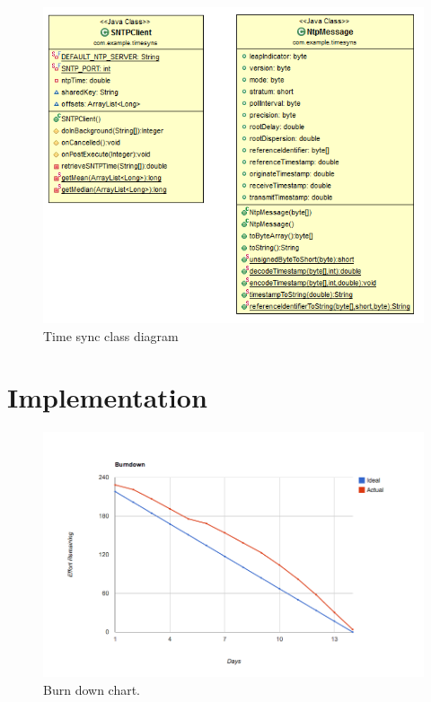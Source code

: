 \begin{figure}[H]
	\centering
		\includegraphics[width=14cm]{sprint5/sprint5_class_diagram.png}
	\caption{Time sync class diagram}
	\label{fig:Time_Sync_class }
\end{figure}

\section{Implementation}

\begin{figure}[H]
	\centering
		\includegraphics[width=18cm]{sprint5/BurndownSprint5.png}
	\caption{Burn down chart.}
	\label{fig:Burn5 }
\end{figure}

